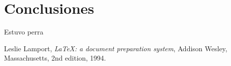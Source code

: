 \documentclass{article}
\begin{document}
\section{Conclusiones}

Estuvo perra 

\begin{thebibliography}{9}

  Leslie Lamport,
  \emph{\LaTeX: a document preparation system},
  Addison Wesley, Massachusetts,
  2nd edition,
  1994.

\end{thebibliography}
\end{document}
